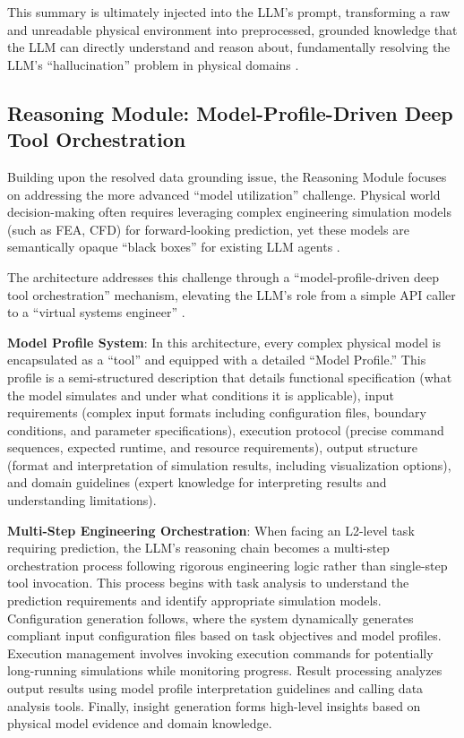This summary is ultimately injected into the LLM's prompt, transforming a raw and unreadable physical environment into preprocessed, grounded knowledge that the LLM can directly understand and reason about, fundamentally resolving the LLM's ``hallucination'' problem in physical domains \cite{ji2023survey}.

\subsection{Reasoning Module: Model-Profile-Driven Deep Tool Orchestration}

Building upon the resolved data grounding issue, the Reasoning Module focuses on addressing the more advanced ``model utilization'' challenge. Physical world decision-making often requires leveraging complex engineering simulation models (such as FEA, CFD) for forward-looking prediction, yet these models are semantically opaque ``black boxes'' for existing LLM agents \cite{hughes2012finite}.

The architecture addresses this challenge through a ``model-profile-driven deep tool orchestration'' mechanism, elevating the LLM's role from a simple API caller to a ``virtual systems engineer'' \cite{lu2022unified}.

\textbf{Model Profile System}: In this architecture, every complex physical model is encapsulated as a ``tool'' and equipped with a detailed ``Model Profile.'' This profile is a semi-structured description that details functional specification (what the model simulates and under what conditions it is applicable), input requirements (complex input formats including configuration files, boundary conditions, and parameter specifications), execution protocol (precise command sequences, expected runtime, and resource requirements), output structure (format and interpretation of simulation results, including visualization options), and domain guidelines (expert knowledge for interpreting results and understanding limitations).

\textbf{Multi-Step Engineering Orchestration}: When facing an L2-level task requiring prediction, the LLM's reasoning chain becomes a multi-step orchestration process following rigorous engineering logic rather than single-step tool invocation. This process begins with task analysis to understand the prediction requirements and identify appropriate simulation models. Configuration generation follows, where the system dynamically generates compliant input configuration files based on task objectives and model profiles. Execution management involves invoking execution commands for potentially long-running simulations while monitoring progress. Result processing analyzes output results using model profile interpretation guidelines and calling data analysis tools. Finally, insight generation forms high-level insights based on physical model evidence and domain knowledge.


